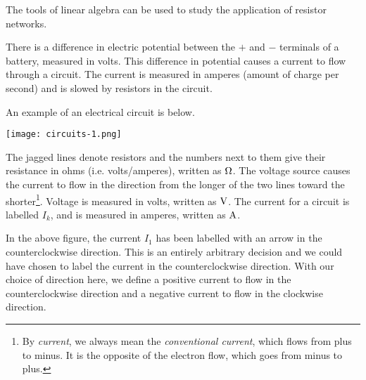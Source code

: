 \documentclass{ximera}
\begin{document}
\begin{exploration}

  The tools of linear algebra can be used to study the application of resistor networks. 

There is a difference in electric potential between the $+$ and $-$ terminals of a battery, measured in volts. This difference in potential causes a current to flow through a circuit. The current is measured in amperes (amount of charge per second) and is slowed by resistors in the circuit. 

An example of an electrical circuit is below.

\begin{center}
  \texttt{[image: circuits-1.png]}
\end{center}

\noindent
The jagged lines %
  denote resistors and the numbers next
to them give their resistance%
 in ohms (i.e. volts/amperes), written as $\ohm$. The voltage%
 source %
  causes the current%
 to flow in the direction from the longer of the two
lines toward the shorter\footnote{By {\em current}, we always mean the
  {\em conventional current}, which flows from plus to minus. It is
  the opposite of the electron flow, which goes from minus to plus.}.
Voltage is measured in volts, written as $\volt$.  The current for a
circuit is labelled $I_k$, and is measured in amperes, written as
$\amp$.

In the above figure, the current $I_1$ has been labelled with an arrow
in the counterclockwise direction. This is an entirely arbitrary
decision and we could have chosen to label the current in the
counterclockwise direction.  With our choice of direction here, we
define a positive current to flow in the counterclockwise direction
and a negative current to flow in the clockwise direction.


\end{exploration}
\end{document}
